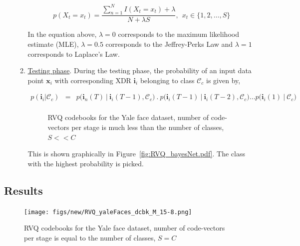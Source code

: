 \begin{enumerate}
\begin{enumerate}
\begin{equation}
p(X_t=x_t) = \frac{\sum\limits_{n=1}^{N}I(X_t=x_t)+\lambda}{N+\lambda S}, \ \ x_t \in \{1, 2, \dots, S\}
\end{equation}
  
In the equation above, $\lambda=0$ corresponds to the maximum likelihood estimate (MLE), $\lambda=0.5$ corresponds to the Jeffrey-Perks Law and $\lambda=1$ corresponds to Laplace's Law.
\item \underline{Testing phase}.  During the testing phase, the probability of an input data point $\mathbf{x}_i$ with corresponding XDR $\mathbf{i}_i$ belonging to class $\mathcal{C}_c$ is given by,

\begin{equation}
\begin{array}{llllll}
p (\mathbf{i}_i|\mathcal{C}_c) &=& p \bigg (\mathbf{i}_n(T) \ | \ \mathbf{i}_i(T-1), \mathcal{C}_c \bigg) \ . \ 
p \bigg(\mathbf{i}_i(T-1) \ | \ \mathbf{i}_i(T-2), \mathcal{C}_c \bigg) \ldots  
p \bigg (\mathbf{i}_i(1) \ | \ \mathcal{C}_c \bigg ) \\
\end{array}
\end{equation}
									\begin{figure}[t]
									\centering
									\caption{RVQ codebooks for the Yale face dataset, number of code-vectors per stage is much less than the number of classes, $S << C$}
									\label{fig:RVQ_codebooks_smallS_Yale}	
									\end{figure}



This is shown graphically in Figure~\ref{fig:RVQ_bayesNet.pdf}.  The class with the highest probability is picked.
\end{enumerate}
\end{enumerate}

\subsection{Results}
									\begin{figure}[t]
									\centering
									\texttt{[image: figs/new/RVQ\_yaleFaces\_dcbk\_M\_15-8.png]}
									\caption{RVQ codebooks for the Yale face dataset, number of code-vectors per stage is equal to the number of classes, $S=C$}
									\label{fig:RVQ_codebooks_largeS_Yale}	
									\end{figure}

